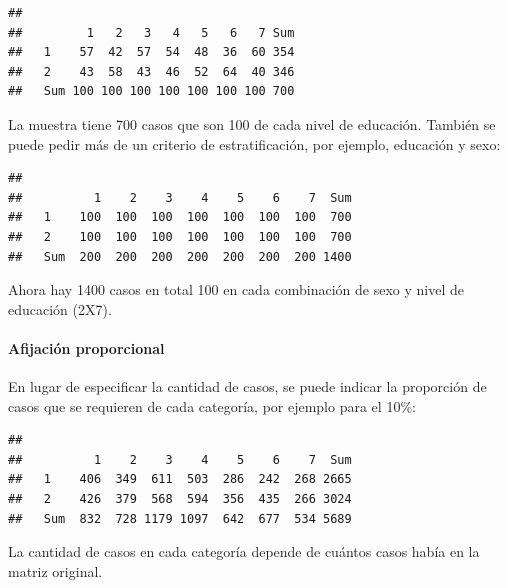 \documentclass[]{article}
\let\oldparagraph\paragraph
\renewcommand{\paragraph}[1]{\oldparagraph{#1}\mbox{}}
\begin{document}
\begin{verbatim}
##      
##         1   2   3   4   5   6   7 Sum
##   1    57  42  57  54  48  36  60 354
##   2    43  58  43  46  52  64  40 346
##   Sum 100 100 100 100 100 100 100 700
\end{verbatim}

La muestra tiene 700 casos que son 100 de cada nivel de educación. También se puede pedir más de un criterio de estratificación, por ejemplo, educación y sexo:

\begin{verbatim}
##      
##          1    2    3    4    5    6    7  Sum
##   1    100  100  100  100  100  100  100  700
##   2    100  100  100  100  100  100  100  700
##   Sum  200  200  200  200  200  200  200 1400
\end{verbatim}

Ahora hay 1400 casos en total 100 en cada combinación de sexo y nivel de educación (2X7).

\hypertarget{afijacion-proporcional}{%
\paragraph{Afijación proporcional}\label{afijacion-proporcional}}

En lugar de especificar la cantidad de casos, se puede indicar la proporción de casos que se requieren de cada categoría, por ejemplo para el 10\%:

\begin{verbatim}
##      
##          1    2    3    4    5    6    7  Sum
##   1    406  349  611  503  286  242  268 2665
##   2    426  379  568  594  356  435  266 3024
##   Sum  832  728 1179 1097  642  677  534 5689
\end{verbatim}

La cantidad de casos en cada categoría depende de cuántos casos había en la matriz original.
\end{document}
